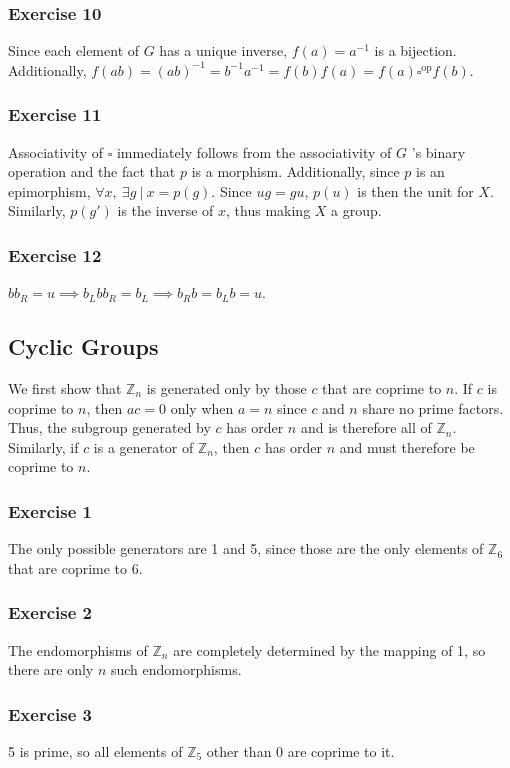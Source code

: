 \subsubsection{Exercise 10} 
Since each element of $G$ has a unique inverse, $f(a) = a^{-1}$ is a bijection. Additionally,
$f(ab) = (ab)^{-1} = b^{-1} a^{-1} = f(b) f(a) = f(a) \square^{\text{op}} f(b)$.

\subsubsection{Exercise 11}
Associativity of $\square$ immediately follows from the associativity of $G$ 's binary operation and
the fact that $p$ is a morphism. Additionally, since $p$ is an epimorphism, $\forall x, \: \exists g
\: | \: x = p(g)$. Since $u g = g u$, $p(u)$ is then the unit for $X$. Similarly, $p(g')$ is the
inverse of $x$, thus making $X$ a group.

\subsubsection{Exercise 12}
$b b_R = u \implies b_L b b_R = b_L \implies b_R b = b_L b = u$.

\subsection{Cyclic Groups}
We first show that $\mathbb{Z}_n$ is generated only by those $c$ that are coprime to $n$. If 
$c$ is coprime to $n$, then $ac = 0$ only when $a = n$ since $c$ and  $n$ share no prime factors.
Thus, the subgroup generated by $c$ has order $n$ and is therefore all of $\mathbb{Z}_n$. Similarly, 
if $c$ is a generator of $\mathbb{Z}_n$, then $c$ has order $n$ and must therefore be coprime to $n$.

\subsubsection{Exercise 1}
The only possible generators are 1 and 5, since those are the only elements of $\mathbb{Z}_6$ 
that are coprime to 6.

\subsubsection{Exercise 2}
The endomorphisms of $\mathbb{Z}_n$ are completely determined by the mapping of 1, so there are
only $n$ such endomorphisms.

\subsubsection{Exercise 3}
5 is prime, so all elements of $\mathbb{Z}_5$ other than 0 are coprime to it. 

